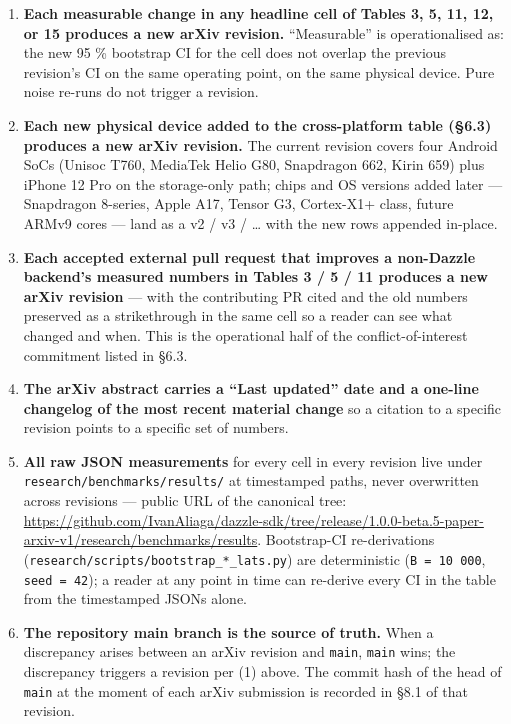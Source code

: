 \begin{enumerate}
\def\labelenumi{\arabic{enumi}.}
\tightlist
\item
  \textbf{Each measurable change in any headline cell of Tables 3, 5, 11, 12, or
  15 produces a new arXiv revision.} ``Measurable'' is operationalised as: the
  new 95 \% bootstrap CI for the cell does not overlap the previous revision's
  CI on the same operating point, on the same physical device. Pure noise
  re-runs do not trigger a revision.
\item
  \textbf{Each new physical device added to the cross-platform table (§6.3)
  produces a new arXiv revision.} The current revision covers four Android SoCs
  (Unisoc T760, MediaTek Helio G80, Snapdragon 662, Kirin 659) plus iPhone 12
  Pro on the storage-only path; chips and OS versions added later --- Snapdragon
  8-series, Apple A17, Tensor G3, Cortex-X1+ class, future ARMv9 cores --- land
  as a v2 / v3 / \ldots{} with the new rows appended in-place.
\item
  \textbf{Each accepted external pull request that improves a non-Dazzle
  backend's measured numbers in Tables 3 / 5 / 11 produces a new arXiv revision}
  --- with the contributing PR cited and the old numbers preserved as a
  strikethrough in the same cell so a reader can see what changed and when. This
  is the operational half of the conflict-of-interest commitment listed in §6.3.
\item
  \textbf{The arXiv abstract carries a ``Last updated'' date and a one-line
  changelog of the most recent material change} so a citation to a specific
  revision points to a specific set of numbers.
\item
  \textbf{All raw JSON measurements} for every cell in every revision live under
  \texttt{research/benchmarks/results/} at timestamped paths, never overwritten
  across revisions --- public URL of the canonical tree:
  \url{https://github.com/IvanAliaga/dazzle-sdk/tree/release/1.0.0-beta.5-paper-arxiv-v1/research/benchmarks/results}.
  Bootstrap-CI re-derivations (\texttt{research/scripts/bootstrap\_*\_lats.py})
  are deterministic (\texttt{B\ =\ 10\ 000}, \texttt{seed\ =\ 42}); a reader at
  any point in time can re-derive every CI in the table from the timestamped
  JSONs alone.
\item
  \textbf{The repository main branch is the source of truth.} When a discrepancy
  arises between an arXiv revision and \texttt{main}, \texttt{main} wins; the
  discrepancy triggers a revision per (1) above. The commit hash of the head of
  \texttt{main} at the moment of each arXiv submission is recorded in §8.1 of
  that revision.
\end{enumerate}

